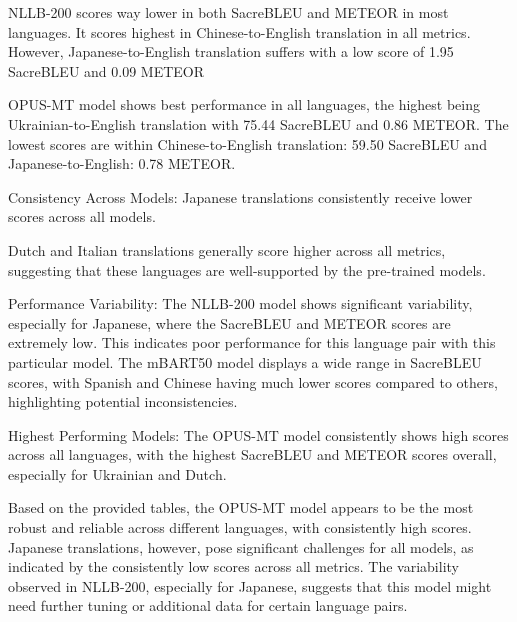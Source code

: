 \documentclass[a4paper]{article}
\begin{document}
NLLB-200 scores way lower in both SacreBLEU and METEOR in most languages. It scores highest in Chinese-to-English translation in all metrics. However, Japanese-to-English translation suffers with a low score of 1.95 SacreBLEU and 0.09 METEOR

OPUS-MT model shows best performance in all languages, the highest being Ukrainian-to-English translation with 75.44 SacreBLEU and 0.86 METEOR. The lowest scores are within Chinese-to-English translation: 59.50 SacreBLEU and Japanese-to-English: 0.78 METEOR.


Consistency Across Models:
Japanese translations consistently receive lower scores across all models.

Dutch and Italian translations generally score higher across all metrics, suggesting that these languages are well-supported by the pre-trained models.

Performance Variability:
The NLLB-200 model shows significant variability, especially for Japanese, where the SacreBLEU and METEOR scores are extremely low. This indicates poor performance for this language pair with this particular model.
The mBART50 model displays a wide range in SacreBLEU scores, with Spanish and Chinese having much lower scores compared to others, highlighting potential inconsistencies.

Highest Performing Models:
The OPUS-MT model consistently shows high scores across all languages, with the highest SacreBLEU and METEOR scores overall, especially for Ukrainian and Dutch.

Based on the provided tables, the OPUS-MT model appears to be the most robust and reliable across different languages, with consistently high scores. Japanese translations, however, pose significant challenges for all models, as indicated by the consistently low scores across all metrics. The variability observed in NLLB-200, especially for Japanese, suggests that this model might need further tuning or additional data for certain language pairs.
\end{document}
